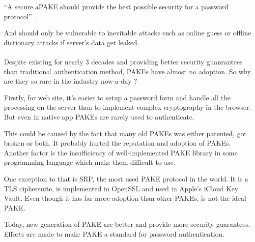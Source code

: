 \documentclass[../report.tex]{subfiles}
\begin{document}
``A secure aPAKE should provide the best possible security for a password protocol'' \cite{OPAQUE_Standard_Draft}.

And should only be vulnerable to inevitable attacks such as online guess or offline dictionary attacks if server's data get leaked.

\paragraph{}






Despite existing for nearly 3 decades and providing better security guanrantees than traditional authentication method, PAKEs have almost no adoption. So why are they so rare in the industry now-a-day ?

Firstly, for web site, it's easier to setup a password form and handle all the processing on the server than to implement complex cryptography in the browser. But even in native app PAKEs are rarely used to authenticate.

This could be caused by the fact that many old PAKEs was either patented, got broken or both. %
It probably hurted the reputation and adoption of PAKEs.
Another factor is the insufficiency of well-implemented PAKE library in some programming language %
which make them difficult to use.

One exception to that is SRP, the most used PAKE protocol in the world. %
 It is a TLS ciphersuite, is implemented in OpenSSL and used in Apple's iCloud Key Vault. Even though it has far more adoption than other PAKEs, is not the ideal PAKE.


Today, new generation of PAKE are better and provide more security guarantees. Efforts are made to make PAKE a standard for password authentication. %
\end{document}
